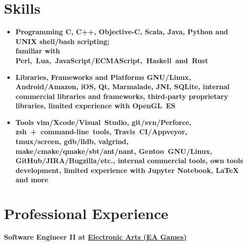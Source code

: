 \section*{Skills}

\begin{itemize}[rightmargin=\dimexpr\linewidth-17.5cm-\leftmargin\relax]
    \item \bfseries Programming\mdseries
        \subitem
        C,
        \bfseries C++\mdseries,
        Objective-C,
        \bfseries Scala\mdseries,
        Java,
        \bfseries Python \mdseries and UNIX shell/\bfseries bash \mdseries scripting;\\
        familiar with Perl,~Lua,~JavaScript/ECMAScript,~Haskell~and~\bfseries Rust\mdseries

    \vspace{0.4cm}
    \item \bfseries Libraries, Frameworks and Platforms\mdseries
        \subitem
        \bfseries GNU/Linux\mdseries,
        Android/Amazon,
        iOS,
        \bfseries Qt\mdseries,
        Marmalade,
        JNI,
        SQLite,
        internal commercial libraries and frameworks,
        third-party proprietary libraries,
        limited experience with OpenGL~ES

    \vspace{0.4cm}
    \item \bfseries Tools\mdseries
        \subitem
        \bfseries vim\mdseries/Xcode/Visual~Studio,
        \bfseries git\mdseries/svn/Perforce,
        zsh~+~command-line~tools,
        \bfseries Travis~CI\mdseries/Appveyor,\\
        tmux/screen,
        \bfseries gdb\mdseries/lldb,
        valgrind,
        make/cmake/qmake/sbt/ant/nant,
        \bfseries Gentoo~\mdseries GNU/Linux,\\
        \bfseries GitHub\mdseries/JIRA/Bugzilla/etc.,
        internal commercial tools,
        own \bfseries tools development\mdseries,
        limited experience with \bfseries Jupyter \mdseries Notebook,
        {\LaTeX }
        and more
\end{itemize}

\section*{Professional Experience}
{
\fontsize{12pt}{12pt}\selectfont
\bfseries Software Engineer II at
\href{http://www.ea.com}{Electronic Arts (EA Games)}
\mdseries
}

